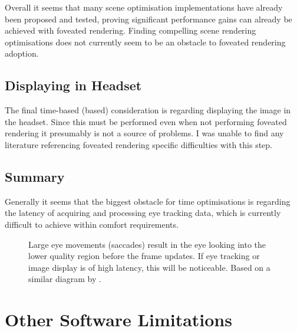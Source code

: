 \documentclass[a4paper,11pt]{article}
\begin{document}
Overall it seems that many scene optimisation implementations have already been proposed and tested, proving significant performance gains can already be achieved with foveated rendering. Finding compelling scene rendering optimisations does not currently seem to be an obstacle to foveated rendering adoption.

\subsection{Displaying in Headset}
The final time-based (based) consideration is regarding displaying the image in the headset. Since this must be performed even when not performing foveated rendering it presumably is not a source of problems. I was unable to find any literature referencing foveated rendering specific difficulties with this step.

\subsection{Summary}
Generally it seems that the biggest obstacle for time optimisations is regarding the latency of acquiring and processing eye tracking data, which is currently difficult to achieve within comfort requirements. 

\begin{figure}
  \begin{center}
    
    \caption{Large eye movements (saccades) result in the eye looking into the lower quality region before the frame updates. If eye tracking or image display is of high latency, this will be noticeable. Based on a similar diagram by \textcite{albert2017latency}.}
    \label{fig:eye}
  \end{center}
\end{figure}

\section{Other Software Limitations}
\end{document}
